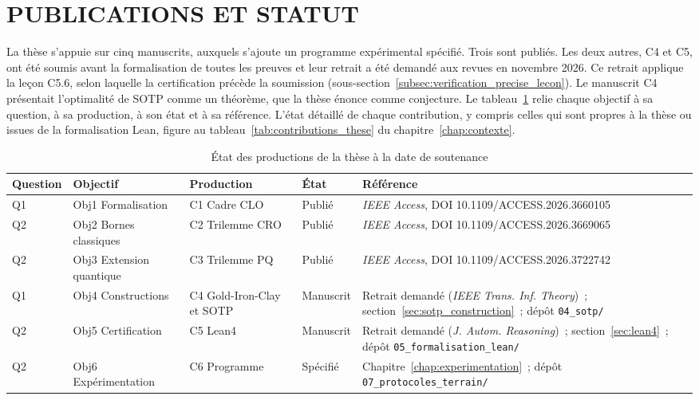 \section{PUBLICATIONS ET STATUT}
\label{sec:ig_publications}
\begin{sloppypar}

La th\`ese s'appuie sur cinq manuscrits, auxquels s'ajoute un programme exp\'erimental sp\'ecifi\'e. Trois sont publi\'es. Les deux autres, C4 et C5, ont \'et\'e soumis avant la formalisation de toutes les preuves et leur retrait a \'et\'e demand\'e aux revues en novembre 2026. Ce retrait applique la le\c{c}on C5.6, selon laquelle la certification pr\'ec\`ede la soumission (sous-section~\ref{subsec:verification_precise_lecon}). Le manuscrit C4 pr\'esentait l'optimalit\'e de SOTP comme un th\'eor\`eme, que la th\`ese \'enonce comme conjecture. Le tableau~\ref{tab:etat_productions} relie chaque objectif \`a sa question, \`a sa production, \`a son \'etat et \`a sa r\'ef\'erence. L'\'etat d\'etaill\'e de chaque contribution, y compris celles qui sont propres \`a la th\`ese ou issues de la formalisation Lean, figure au tableau~\ref{tab:contributions_these} du chapitre~\ref{chap:contexte}.

\begin{table}[htbp]
\centering
\caption{\'Etat des productions de la th\`ese \`a la date de soutenance}
\label{tab:etat_productions}
\footnotesize
\begin{tabular}{p{1.1cm}p{2.6cm}p{2.9cm}p{1.3cm}p{5.0cm}}
\toprule
\textbf{Question} & \textbf{Objectif} & \textbf{Production} & \textbf{\'Etat} & \textbf{R\'ef\'erence} \\
\midrule
Q1 & Obj1 Formalisation & C1 Cadre CLO & Publi\'e & \textit{IEEE Access}, DOI 10.1109/ACCESS.2026.3660105~\cite{MINKA2026CLO} \\
Q2 & Obj2 Bornes classiques & C2 Trilemme CRO & Publi\'e & \textit{IEEE Access}, DOI 10.1109/ACCESS.2026.3669065~\cite{MINKA2026CRO} \\
Q2 & Obj3 Extension quantique & C3 Trilemme PQ & Publi\'e & \textit{IEEE Access}, DOI 10.1109/ACCESS.2026.3722742~\cite{MINKA2026PQCRO} \\
Q1 & Obj4 Constructions & C4 Gold-Iron-Clay et SOTP & Manuscrit & Retrait demand\'e (\textit{IEEE Trans. Inf. Theory})~; section~\ref{sec:sotp_construction}~; d\'ep\^ot \texttt{04\_sotp/}~\cite{CROTrilemmaDepot} \\
Q2 & Obj5 Certification & C5 Lean4 & Manuscrit & Retrait demand\'e (\textit{J. Autom. Reasoning})~; section~\ref{sec:lean4}~; d\'ep\^ot \texttt{05\_formalisation\_lean/} \\
Q2 & Obj6 Exp\'erimentation & C6 Programme & Sp\'ecifi\'e & Chapitre~\ref{chap:experimentation}~; d\'ep\^ot \texttt{07\_protocoles\_terrain/} \\
\bottomrule
\end{tabular}
\end{table}

\end{sloppypar}

